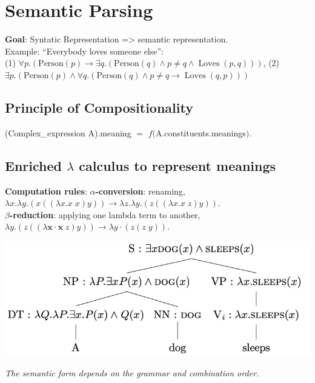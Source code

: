 \section{Semantic Parsing}

\textbf{Goal}: Syntatic Representation => semantic representation. \\ Example: “Everybody loves someone else”: \\ (1) $ \forall p .(\mathrm{Person}(p) \rightarrow \exists q .(\mathrm{Person}(q) \wedge p \neq q \wedge \operatorname{Loves}(p, q)))$, \quad (2) $ \exists p .(\mathrm{Person}(p) \wedge \forall q .(\mathrm{Person}(q) \wedge p \neq q \rightarrow \operatorname{Loves}(q, p)))$

\subsection*{Principle of Compositionality}
(Complex\_expression A).meaning $=$ $f($A.constituents.meanings$)$.

\subsection*{Enriched $\lambda$ calculus to represent meanings}
\textbf{Computation rules}: $\alpha$\textbf{-conversion}: renaming, \\
$\lambda x . \lambda y .(x((\lambda x . x \; x) y)) \rightarrow \lambda z . \lambda y .(z((\lambda x . x \; z) y))$. \\
$\beta$\textbf{-reduction}: applying one lambda term to another, $\lambda y .(z((\lambda \mathbf{x} \cdot \mathbf{x} \; z) y)) \rightarrow \lambda y \cdot(z(z \;y))$.
\vspace{-0.4cm}
\begin{center}
    \includegraphics[width=\columnwidth]{img/semantic_representation.png}
\end{center}
\vspace{-0.5cm}
\textit{The semantic form depends on the grammar and combination order.}

